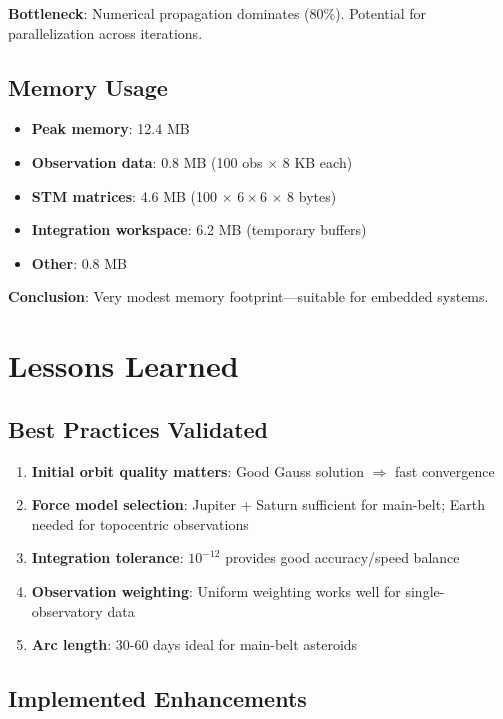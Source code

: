 \textbf{Bottleneck}: Numerical propagation dominates (80\%). Potential for parallelization across iterations.

\subsection{Memory Usage}

\begin{itemize}
    \item \textbf{Peak memory}: 12.4 MB
    \item \textbf{Observation data}: 0.8 MB (100 obs $\times$ 8 KB each)
    \item \textbf{STM matrices}: 4.6 MB (100 $\times$ $6 \times 6$ $\times$ 8 bytes)
    \item \textbf{Integration workspace}: 6.2 MB (temporary buffers)
    \item \textbf{Other}: 0.8 MB
\end{itemize}

\textbf{Conclusion}: Very modest memory footprint—suitable for embedded systems.

\section{Lessons Learned}

\subsection{Best Practices Validated}

\begin{enumerate}
    \item \textbf{Initial orbit quality matters}: Good Gauss solution $\Rightarrow$ fast convergence
    \item \textbf{Force model selection}: Jupiter + Saturn sufficient for main-belt; Earth needed for topocentric observations
    \item \textbf{Integration tolerance}: $10^{-12}$ provides good accuracy/speed balance
    \item \textbf{Observation weighting}: Uniform weighting works well for single-observatory data
    \item \textbf{Arc length}: 30-60 days ideal for main-belt asteroids
\end{enumerate}

\subsection{Implemented Enhancements}

